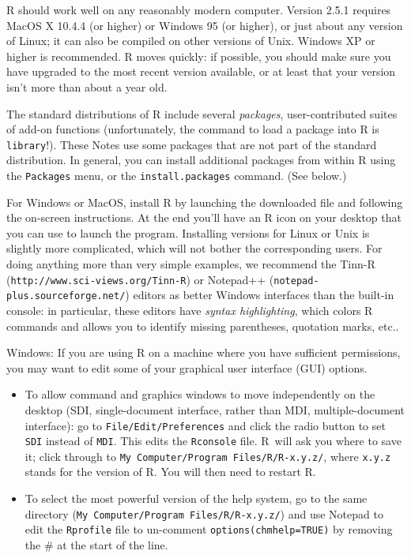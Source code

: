 \documentclass[11pt,]{article}
\begin{document}
R should work well on any reasonably modern computer. Version 2.5.1
requires MacOS X 10.4.4 (or higher) or Windows 95 (or higher), or just
about any version of Linux; it can also be compiled on other versions of
Unix. Windows XP or higher is recommended. R moves quickly: if possible,
you should make sure you have upgraded to the most recent version
available, or at least that your version isn't more than about a year
old.

The standard distributions of R include several \emph{packages},
user-contributed suites of add-on functions (unfortunately, the command
to load a package into R is \texttt{library}!). These Notes use some
packages that are not part of the standard distribution. In general, you
can install additional packages from within R using the
\texttt{Packages} menu, or the \texttt{install.packages} command. (See
below.)

For Windows or MacOS, install R by launching the downloaded file and
following the on-screen instructions. At the end you'll have an R icon
on your desktop that you can use to launch the program. Installing
versions for Linux or Unix is slightly more complicated, which will not
bother the corresponding users. For doing anything more than very simple
examples, we recommend the Tinn-R
(\texttt{http://www.sci-views.org/Tinn-R}) or Notepad++
(\texttt{notepad-plus.sourceforge.net/}) editors as better Windows
interfaces than the built-in console: in particular, these editors have
\emph{syntax highlighting}, which colors R commands and allows you to
identify missing parentheses, quotation marks, etc..

Windows: If you are using R on a machine where you have sufficient
permissions, you may want to edit some of your graphical user interface
(GUI) options.

\begin{itemize}
\item
  To allow command and graphics windows to move independently on the
  desktop (SDI, single-document interface, rather than MDI,
  multiple-document interface): go to \texttt{File/Edit/Preferences} and
  click the radio button to set \texttt{SDI} instead of \texttt{MDI}.
  This edits the \texttt{Rconsole} file. R~will ask you where to save
  it; click through to \texttt{My\ Computer/Program\ Files/R/R-x.y.z/},
  where \texttt{x.y.z} stands for the version of R. You will then need
  to restart R.
\item
  To select the most powerful version of the help system, go to the same
  directory (\texttt{My\ Computer/Program\ Files/R/R-x.y.z/}) and use
  Notepad to edit the \texttt{Rprofile} file to un-comment
  \texttt{options(chmhelp=TRUE)} by removing the \# at the start of the
  line.
\end{itemize}
\end{document}
